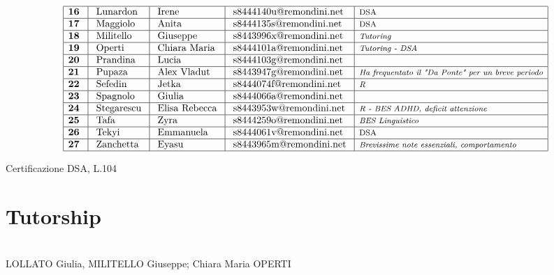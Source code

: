 \documentclass[10pt, a4paper twoside, notitlepage, notoc, justified]{tufte-handout}
\begin{document}
$$\begin{array}{|l|l|l|l|l|}
\hline \text {\bf 16 } & \text { Lunardon } & \text { Irene } & \text { s8444140u@remondini.net } & \text {\footnotesize DSA}\\
\hline \text {\bf 17 } & \text { Maggiolo } & \text { Anita } & \text { s8444135s@remondini.net } & \text {\footnotesize DSA}\\
\hline \text {\bf 18 } & \text { Militello } & \text { Giuseppe } & \text { s8443996x@remondini.net } & \text {\emph {\footnotesize Tutoring }}\\
\hline \text {\bf 19 } & \text { Operti } & \text { Chiara Maria } & \text { s8444101a@remondini.net } & \text {\emph {\footnotesize Tutoring - DSA}}\\
\hline \text {\bf 20 } & \text { Prandina } & \text { Lucia } & \text { s8444103g@remondini.net } & \\
\hline \text {\bf 21 } & \text { Pupaza } & \text { Alex Vladut } & \text { s8443947g@remondini.net } & \text {\emph {\footnotesize Ha frequentato il "Da Ponte" per un breve periodo}}\\
\hline \text {\bf 22 } & \text { Sefedin } & \text { Jetka } & \text { s8444074f@remondini.net } & \text {\emph {\footnotesize R}}\\
\hline \text {\bf 23 } & \text { Spagnolo } & \text { Giulia } & \text { s8444066a@remondini.net } & \\
\hline \text {\bf 24 } & \text { Stegarescu } & \text { Elisa Rebecca } & \text { s8443953w@remondini.net } & \text {\emph {\footnotesize R - BES ADHD, deficit attenzione}}\\
\hline \text {\bf 25 } & \text { Tafa } & \text { Zyra } & \text { s8444259o@remondini.net } & {\emph {\footnotesize BES Linguistico}}\\
\hline \text {\bf 26 } & \text { Tekyi } & \text { Emmanuela } & \text { s8444061v@remondini.net } & \text {\footnotesize DSA}\\
\hline \text {\bf 27 } & \text { Zanchetta } & \text { Eyasu } & \text { s8443965m@remondini.net } & {\emph {\footnotesize Brevissime note essenziali, comportamento}}\\
\hline
\end{array}
$$

\newthought{*} Certificazione DSA, L.104


\newpage
\section{Tutorship}
\\ LOLLATO Giulia, MILITELLO Giuseppe; Chiara Maria OPERTI
\end{document}
